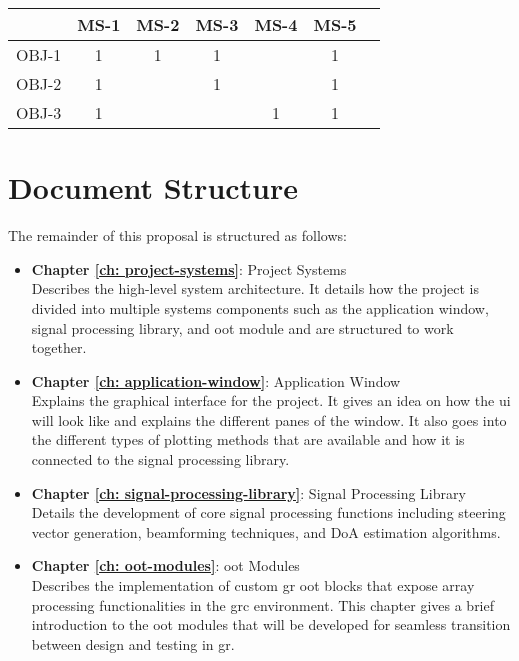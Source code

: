 \begin{center}
	\begin{tabular}{|c|c|c|c|c|c|c|}
		\hline
		& MS-1 & MS-2 & MS-3 & MS-4 & MS-5 \\ \hline
		OBJ-1 & 1    & 1    &  1    &     &   1         \\ \hline
		OBJ-2 & 1    &      &  1    &     &   1         \\ \hline
		OBJ-3 & 1    &      &       & 1   &   1    \\ \hline
	\end{tabular}
\end{center}

\section{Document Structure}

The remainder of this proposal is structured as follows:

\begin{itemize}
	
	\item \textbf{Chapter \ref{ch: project-systems}}: Project Systems \\
	\indent Describes the high-level system architecture. It details how the project is divided into multiple systems  components such as the application window, signal processing library, and \ac{oot} module and are structured to work together.
	
	\item \textbf{Chapter \ref{ch: application-window}}: Application Window \\
	\indent Explains the graphical interface for the project. It gives an idea on how the \ac{ui} will look like and explains the different panes of the window. It also goes into the different types of plotting methods that are available and how it is connected to the signal processing library.
	
	\item \textbf{Chapter \ref{ch: signal-processing-library}}: Signal Processing Library \\
	\indent Details the development of core signal processing functions including steering vector generation, beamforming techniques, and DoA estimation algorithms.
	
	\item \textbf{Chapter \ref{ch: oot-modules}}: \acf{oot} Modules \\
	\indent Describes the implementation of custom \acl{gr} \ac{oot} blocks that expose array processing functionalities in the \ac{grc} environment. This chapter gives a brief introduction to the \ac{oot} modules that will be developed for seamless transition between design and testing in \ac{gr}.
	
\end{itemize}



